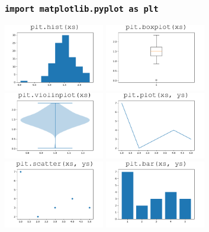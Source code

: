 \documentclass{beamer}
\begin{document}
\begin{frame}
\frametitle{\texttt{import matplotlib.pyplot as plt}}
\begin{center}
\includegraphics[width=0.33\textwidth]{hist.pdf}
\includegraphics[width=0.33\textwidth]{box.pdf}
\includegraphics[width=0.33\textwidth]{violin.pdf}\newline
\vspace{7mm}
\includegraphics[width=0.33\textwidth]{line.pdf}
\includegraphics[width=0.33\textwidth]{scatter.pdf}
\includegraphics[width=0.33\textwidth]{bar.pdf}
\end{center}
\end{frame}
\end{document}
